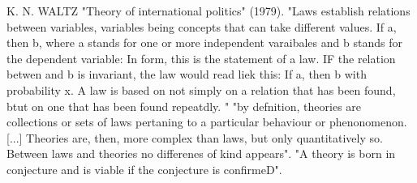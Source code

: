 \documentclass[12pt,a4paper]{article}
\begin{document}
	
K. N. WALTZ "Theory of international politics" (1979).
"Laws establish relations between variables, variables being concepts that can take different values. If a, then b, where a stands for one or more independent varaibales and b stands for the dependent variable:  In form, this is the statement of a law. IF the relation betwen and b is invariant, the law would read liek this: If a, then b with probability x. A law is based on not simply on a relation that has been found, btut on one that has been found repeatdly. " "by defnition, theories are collections or sets of laws pertaning to a particular behaviour or phenonomenon. [...] Theories are, then, more complex than laws, but only quantitatively so. Between laws and theories no differenes of kind appears". "A theory is born in conjecture and is viable if the conjecture is confirmeD".
\end{document}
